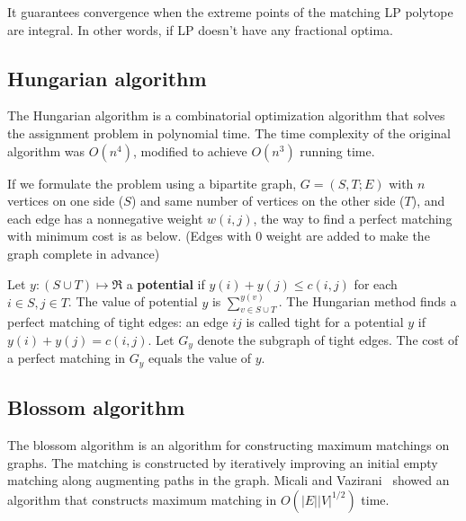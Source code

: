 It guarantees convergence when the extreme points of the matching LP polytope are integral. In other words, if LP doesn't have any fractional optima. 


\subsection{Hungarian algorithm~\cite{wiki_hungarian}}
The Hungarian algorithm is a combinatorial optimization algorithm that solves the assignment problem in polynomial time. 
The time complexity of the original algorithm was $O(n^4)$, modified to achieve $O(n^3)$ running time. 

If we formulate the problem using a bipartite graph, $G=(S, T;E)$ with $n$ vertices on one side ($S$) and same number of vertices on the other side ($T$), and each edge has a nonnegative weight $w(i, j)$, the way to find a perfect matching with minimum cost is as below. (Edges with 0 weight are added to make the graph complete in advance)

Let $y:(S \cup T) \mapsto \Re$ a \textbf{potential} if $y(i) + y(j) \leq c(i,j)$ for each $i \in S, j \in T$.
The value of potential $y$ is $\sum_{v \in S \cup T}^{y(v)}$. The Hungarian method finds a perfect matching of tight edges: an edge $ij$ is called tight for a potential $y$ if $y(i) + y(j) = c(i,j)$. Let $G_y$ denote the subgraph of tight edges. The cost of a perfect matching in $G_y$ equals the value of $y$.

\subsection{Blossom algorithm~\cite{wiki_blossom}}
The blossom algorithm is an algorithm for constructing maximum matchings on graphs.
The matching is constructed by iteratively improving an initial empty matching along augmenting paths in the graph. 
Micali and Vazirani~\cite{blossom} showed an algorithm that constructs maximum matching in $O(|E||V|^{1/2})$ time.

